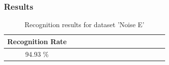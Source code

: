 \subsubsection{Results}
\begin{table}[H]
\centering
\caption{Recognition results for dataset 'Noise E'}
\begin{tabular}{ccccccccccccccc}
  \hline
      Recognition Rate \\
  \hline
      94.93 \% \\
  \hline
\end{tabular}
\end{table}
\vspace{65mm}